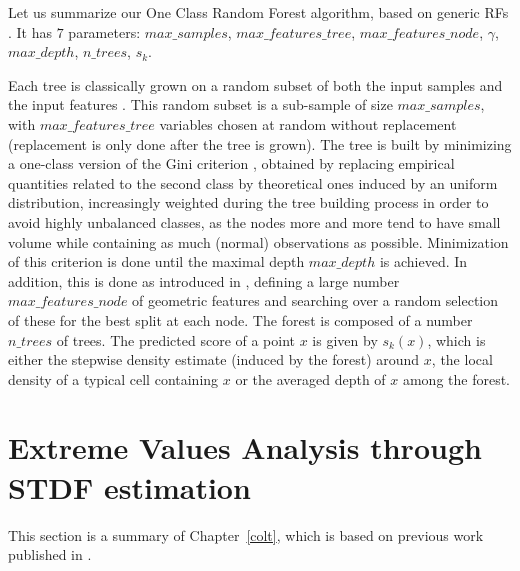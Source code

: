 Let us summarize our One Class Random Forest algorithm, based on generic RFs \citep{Breiman2001}. It has $7$ parameters:
$max\_samples$, $max\_features\_tree$, $max\_features\_node$, $\gamma$, $max\_depth$, $n\_trees$, $s_k$.

Each tree is classically grown on a random subset of both the input samples and the input features \citep{Ho1998, Panov2007}.
This random subset is a sub-sample of size $max\_samples$, with $max\_features\_tree$ variables chosen at random without replacement (replacement is only done after the tree is grown). The tree is built by minimizing 
a one-class version of the Gini criterion \citep{Gini1912}, obtained by replacing empirical quantities related to the second class by theoretical ones induced by an uniform distribution, increasingly weighted during the tree building process in order to avoid highly unbalanced classes, as the nodes more and more tend to have small volume while containing as much (normal) observations as possible.
%
Minimization of this criterion is done until the maximal depth $max\_depth$ is achieved.
In addition, this is done as introduced in \citep{Amit1997}, defining a large number $max\_features\_node$ of geometric features and searching over a random selection of these for the best split at each node.
%
The forest is composed of a number $n\_trees$ of trees. The predicted score of a point $x$ is given by $s_k(x)$, which is either the stepwise density estimate (induced by the forest) around $x$, the local density of a typical cell containing $x$ or the averaged depth of $x$ among the forest.




\section{Extreme Values Analysis through STDF estimation}
\label{resume:stdf}
This section is a summary of Chapter~\ref{colt}, which is based on previous work published in \cite{COLT15}.

